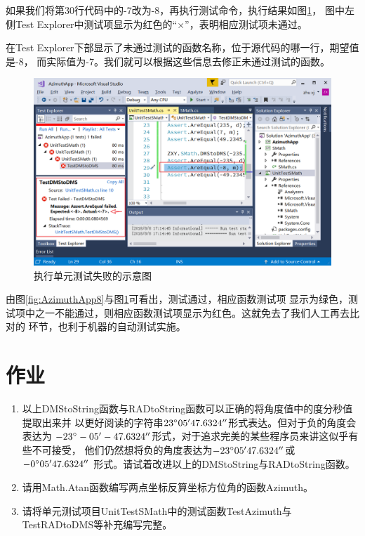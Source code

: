 如果我们将第30行代码中的-7改为-8，再执行测试命令，执行结果如图\ref{fig:AzimuthApp9}，
图中左侧Test Explorer中测试项显示为红色的``×''，表明相应测试项未通过。

在Test Explorer下部显示了未通过测试的函数名称，位于源代码的哪一行，期望值是-8，
而实际值为-7。我们就可以根据这些信息去修正未通过测试的函数。

\begin{figure}[htbp]
    \centering
    \includegraphics[scale=0.65]{chapter/surveybase/AzimuthApp9.png}
    \caption{执行单元测试失败的示意图}
    \label{fig:AzimuthApp9}
\end{figure}

由图\ref{fig:AzimuthApp8}与图\ref{fig:AzimuthApp9}可看出，测试通过，相应函数测试项
显示为绿色，测试项中之一不能通过，则相应函数测试项显示为红色。这就免去了我们人工再去比对的
环节，也利于机器的自动测试实施。


\section*{作业}

\begin{enumerate}
\item 以上DMStoString函数与RADtoString函数可以正确的将角度值中的度分秒值提取出来并
以更好阅读的字符串$23^\circ 05'47.6324''$形式表达。但对于负的角度会表达为
$-23^\circ -05'-47.6324''$形式，对于追求完美的某些程序员来讲这似乎有些不可接受，
他们仍然想将负的角度表达为$-23^\circ 05'47.6324''$或$-0^\circ 05'47.6324''$
形式。请试着改进以上的DMStoString与RADtoString函数。
    
\item 请用Math.Atan函数编写两点坐标反算坐标方位角的函数Azimuth。

\item 请将单元测试项目UnitTestSMath中的测试函数TestAzimuth与TestRADtoDMS等补充编写完整。
\end{enumerate}
